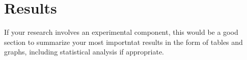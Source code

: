 \section{Results}\label{sec:results}

If your research involves an experimental component, this would be a good section to summarize your most importntat results in the form of tables and graphs, including statistical analysis if appropriate.